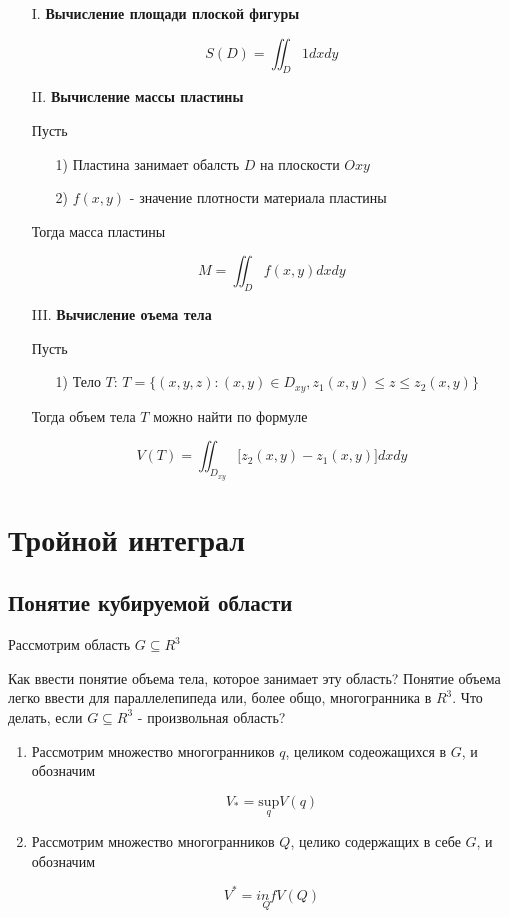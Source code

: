 \documentclass[a4paper, 14pt]{report}
\begin{document}
\begin{enumerate}
    \item[I.] \textbf{Вычисление площади плоской фигуры}

    $$
        S(D) = \iint_D 1 dx dy
    $$

    \item[II.] \textbf{Вычисление массы пластины}

        Пусть 
        \begin{enumerate}
            \item[1)] Пластина занимает обалсть $D$ на плоскости $Oxy$
            \item[2)] $f(x,y)$ - значение плотности материала пластины
        \end{enumerate}

        Тогда масса пластины

        $$
        M = \iint_D f(x,y) dxdy
        $$

    \item[III.] \textbf{Вычисление оъема тела}

        Пусть

        \begin{enumerate}
            \item[1)] Тело $T$: $T = \{ (x,y,z): (x,y) \in D_{xy}, z_1(x,y) \le z \le z_2(x,y) \}$
        \end{enumerate}

        Тогда объем тела $T$ можно найти по формуле

        $$
        V(T) = \iint_{D_{xy}} \big[ z_2(x,y) - z_1(x,y) \big] dxdy
        $$

\end{enumerate}

\section{Тройной интеграл}

\subsection{Понятие кубируемой области}

Рассмотрим область $G \subseteq R^3$

Как ввести понятие объема тела, которое занимает эту область? Понятие объема легко ввести для параллелепипеда или, более общо, многогранника в $R^3$. Что делать, если $G \subseteq R^3$ - произвольная область?

\begin{enumerate}
    \item Рассмотрим множество многогранников $q$, целиком содеожащихся в $G$, и обозначим 

        $$
        V_* = \underset{q}{\text{sup}} V(q)
        $$

    \item Рассмотрим множество многогранников $Q$, целико содержащих в себе $G$, и обозначим 

        $$
        V^* = \underset{Q}{inf} V(Q)
        $$
\end{enumerate}
\end{document}
